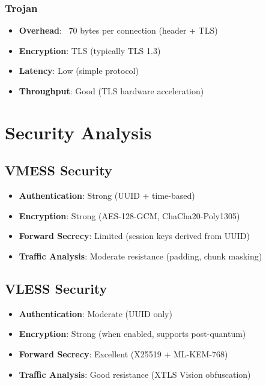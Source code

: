 \subsubsection{Trojan}
\begin{itemize}
    \item \textbf{Overhead}: ~70 bytes per connection (header + TLS)
    \item \textbf{Encryption}: TLS (typically TLS 1.3)
    \item \textbf{Latency}: Low (simple protocol)
    \item \textbf{Throughput}: Good (TLS hardware acceleration)
\end{itemize}

\section{Security Analysis}

\subsection{VMESS Security}

\begin{itemize}
    \item \textbf{Authentication}: Strong (UUID + time-based)
    \item \textbf{Encryption}: Strong (AES-128-GCM, ChaCha20-Poly1305)
    \item \textbf{Forward Secrecy}: Limited (session keys derived from UUID)
    \item \textbf{Traffic Analysis}: Moderate resistance (padding, chunk masking)
\end{itemize}

\subsection{VLESS Security}

\begin{itemize}
    \item \textbf{Authentication}: Moderate (UUID only)
    \item \textbf{Encryption}: Strong (when enabled, supports post-quantum)
    \item \textbf{Forward Secrecy}: Excellent (X25519 + ML-KEM-768)
    \item \textbf{Traffic Analysis}: Good resistance (XTLS Vision obfuscation)
\end{itemize}

